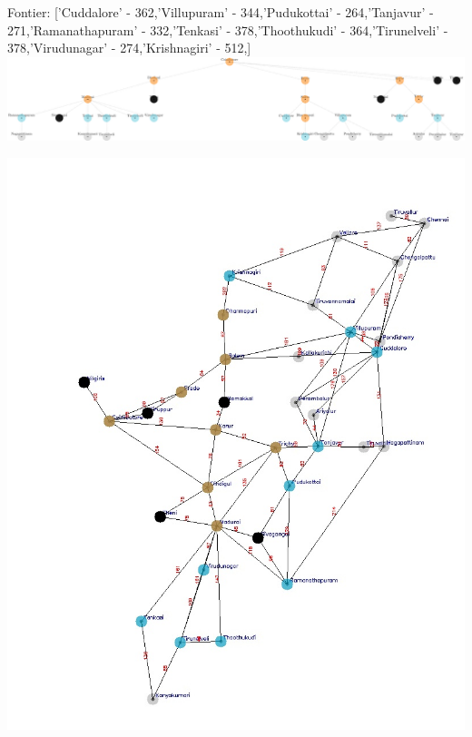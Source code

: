 \documentclass[xcolor=table]{beamer}
\begin{document}
\begin{frame}
  { \tiny Fontier: ['Cuddalore' - 362,'Villupuram' - 344,'Pudukottai' - 264,'Tanjavur' - 271,'Ramanathapuram' - 332,'Tenkasi' - 378,'Thoothukudi' - 364,'Tirunelveli' - 378,'Virudunagar' - 274,'Krishnagiri' - 512,]}
  \includegraphics[width=1\textwidth]{../UCSNodes/20-1.png}
  \begin{center}
    \includegraphics[height=0.55\textheight]{../UCSoutput/tamilUCS18.jpg}
  \end{center}
\end{frame}
\end{document}
